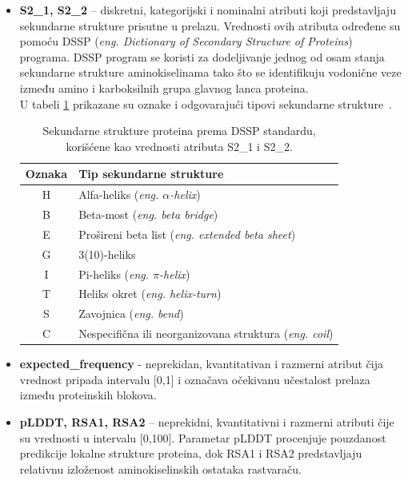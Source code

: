 \documentclass[a4paper,12pt]{article}
\begin{document}
\begin{itemize}
\begin{table}[h!]
	\caption{Aminokiseline i njihove jednoslovne oznake korišćene kao vrednosti atributa AA1 i AA2.}
	\label{Tabela:2}
\end{table}
\newpage
    \item \textbf{S2\_1, S2\_2} – diskretni, kategorijski i nominalni atributi koji predstavljaju sekundarne strukture prisutne u prelazu. Vrednosti ovih atributa određene su pomoću DSSP (\textit{eng. Dictionary of Secondary Structure of Proteins}) programa. DSSP program se koristi za dodeljivanje jednog od osam stanja sekundarne strukture aminokiselinama tako što se identifikuju vodonične veze između amino i karboksilnih grupa glavnog lanca proteina. \\
U tabeli \ref{Tabela:3} prikazane su oznake i odgovarajući tipovi sekundarne strukture~\cite{carter2003dsspcont}.
\\
\begin{table}[h!]
    \centering
    \begin{tabular}{ |c|l| } 
    \hline
    \textbf{Oznaka} & \textbf{Tip sekundarne strukture} \\
    \hline
    H & Alfa-heliks (\textit{eng. $\alpha$-helix}) \\
    B & Beta-most (\textit{eng. beta bridge}) \\
    E & Prošireni beta list (\textit{eng. extended beta sheet}) \\
    G & 3(10)-heliks \\
    I & Pi-heliks (\textit{eng. $\pi$-helix}) \\
    T & Heliks okret (\textit{eng. helix-turn}) \\
    S & Zavojnica (\textit{eng. bend}) \\
    C & Nespecifična ili neorganizovana struktura (\textit{eng. coil}) \\
    \hline
    \end{tabular}
    \caption{Sekundarne strukture proteina prema DSSP standardu, korišćene kao vrednosti atributa S2\_1 i S2\_2.}
    \label{Tabela:3}
\end{table}
\newpage
    \item \textbf{expected\_frequency} - neprekidan, kvantitativan i razmerni atribut čija vrednost pripada intervalu [0,1] i označava očekivanu učestalost prelaza između proteinskih blokova.
    \item \textbf{pLDDT, RSA1, RSA2} – neprekidni, kvantitativni i razmerni atributi čije su vrednosti u intervalu [0,100]. Parametar pLDDT procenjuje pouzdanost predikcije lokalne strukture proteina, dok RSA1 i RSA2 predstavljaju relativnu izloženost aminokiselinskih ostataka rastvaraču.
\end{itemize}
\end{document}
